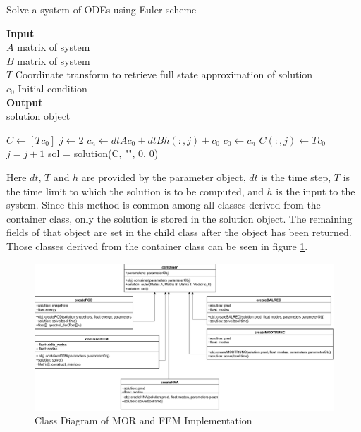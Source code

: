 \begin{algorithm}[H]
\caption{Solve a system of ODEs using Euler scheme}
\textbf{Input} \\
 \hspace*{\algorithmicindent} $A$ matrix of system \\
 \hspace*{\algorithmicindent} $B$ matrix of system \\
 \hspace*{\algorithmicindent} $T$ Coordinate transform to retrieve full state approximation of solution \\
 \hspace*{\algorithmicindent} $c_0$ Initial condition \\
 \textbf{Output} \\
 \hspace*{\algorithmicindent} solution object
\begin{algorithmic}[1]
\State $C \gets [Tc_0]$
\State $j \gets 2$
\State $c_n \gets dt A c_0 + dt B h(:, j) + c_0$
\State $c_0 \gets c_n$
\State $C(:, j) \gets T c_0$
\State $j = j+1$
\EndFor 
\State sol = solution(C, "", 0, 0)
\EndProcedure
\end{algorithmic}
\end{algorithm}
Here \(dt\), \(T\) and \(h\) are provided by the parameter object,
\(dt\) is the time step, \(T\) is the time limit to which the solution is to be computed, and \(h\) is the input to the system.
Since this method is common among all classes derived from the container class, only the solution is stored in the solution object.
The remaining fields of that object are set in the child class after the object has been returned.
Those classes derived from the container class can be seen in figure \ref{fig-class-2}.
\begin{figure}[H]
\includegraphics[width=\textwidth]{images/container}
\caption{Class Diagram of MOR and FEM Implementation}
\label{fig-class-2}
\end{figure}

